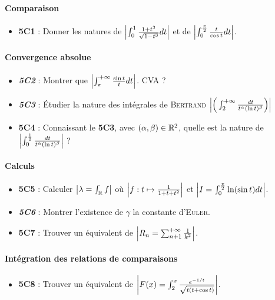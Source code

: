 	\paragraph*{Comparaison}
		\begin{itemize}
			\item \textbf{5C1} : Donner les natures de $\left\vert \int_0^1 \frac{1+t^3}{\sqrt{1-t^3}} dt  \right\vert $ et de $\left\vert \int_0^{\frac{\pi}{2}} \frac{t}
			{\cos t} dt \right\vert $.
		\end{itemize}
		
	\paragraph*{Convergence absolue}
		\begin{itemize}
			\item \emph{\textbf{5C2}} : Montrer que $\left\vert \int_{\pi}^{+\infty} \frac{\sin t}{t} dt  \right\vert $. CVA ?
			\item \emph{\textbf{5C3}} : Étudier la nature des intégrales de \textsc{Bertrand} $\left\vert \Big( \int_2^{+\infty} \frac{dt}{t^{\alpha}(\ln t)^{\beta}} \Big)  \right\vert$
			\item \textbf{5C4} : Connaissant le \textbf{5C3}, avec $(\alpha,\beta)\in{\mathbb{R}}^2$, quelle est la nature de $\left\vert \int_0^{\frac{1}{2}} 
			\frac{dt}{t^{\alpha}(\ln t)^{\beta}}  \right\vert$ ?
		\end{itemize}
		
	\paragraph*{Calculs}
		\begin{itemize}
			\item \textbf{5C5} : Calculer $\left\vert  \lambda = \int_{\mathbb{R}} f \right\vert$ où $\left\vert  f : t\mapsto \frac{1}{1+t+t^2}  \right\vert$ et $\left\vert  I = \int_0^{\frac{\pi}{2}} 
			\ln (\sin t ) dt  \right\vert$.
			\item \emph{\textbf{5C6}} : Montrer l'existence de $\gamma$ la constante d'\textsc{Euler}.
			\item \textbf{5C7} : Trouver un équivalent de $\left\vert  R_n = \sum_{n+1}^{+\infty} \frac{1}{k^2}  \right\vert $.
		\end{itemize}
		
	\paragraph*{Intégration des relations de comparaisons}
		\begin{itemize}
			\item \textbf{5C8} : Trouver un équivalent de $\left\vert  F(x) = \int_2^x \frac{e^{-1/t}}{\sqrt{t(t+\cos t)}}  \right\vert$.
		\end{itemize}
		
	\medskip
	
\fin
